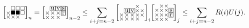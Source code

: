 \documentclass[a4paper,12pt]{article}
\makeatletter
\newcommand{\mybox}[1]{%
  \begingroup
  \setlength{\fboxsep}{1pt}%
  \fbox{\small #1}%
  \endgroup
}
\newenvironment{grid}
  {\begingroup\footnotesize
   \renewcommand{\arraystretch}{0}
   \setlength{\arraycolsep}{0pt}
   \left[\begin{array}{@{}*{10}{c}@{}}}
  {\end{array}\right]\endgroup}
\newcommand{\void}{\phantom{\times}}
\makeatother
\begin{document}
	\[
		 \begin{grid}
			\void & \square & \square & \square \\
			\times & \blacksquare & \blacksquare & \square \\
			\times & \times & \times & \void
		    \end{grid}_n = \begin{grid}
			\void & \mybox{u} & \mybox{v} & \mybox{s} \\
			\times & \times & \times & \mybox{r} \\
			\times & \times & \times & \void
		 \end{grid}_{n-2} \le \sum_{i+j=n-2} \begin{grid}
			 \void & \void & \void & \times & \void\\
			 \void & \mybox{u} & \mybox{v} & \times & \times \\
			 \times & \times & \times & \times & \times \\
			 \times & \times & \times & \times & \void
		 \end{grid}_i \begin{grid}
			\void & \times & \times & \void \\
			\times & \times & \times & \mybox{s} \\
			\times & \times & \times & \mybox{r} \\
			\times & \times & \times & \void
		 \end{grid}_j \le \sum_{i+j=n-2} R(i)U(j).
	\]
\end{document}
